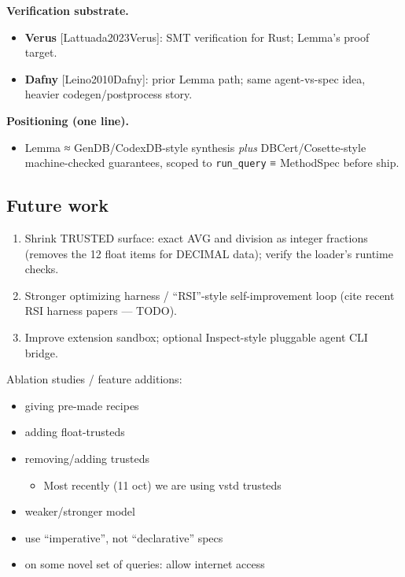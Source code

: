 \documentclass[
]{article}
\providecommand{\tightlist}{%
  \setlength{\itemsep}{0pt}\setlength{\parskip}{0pt}}
\begin{document}
\textbf{Verification substrate.}

\begin{itemize}
\tightlist
\item
  \textbf{Verus} {[}Lattuada2023Verus{]}: SMT verification for Rust;
  Lemma's proof target.
\item
  \textbf{Dafny} {[}Leino2010Dafny{]}: prior Lemma path; same
  agent-vs-spec idea, heavier codegen/postprocess story.
\end{itemize}

\textbf{Positioning (one line).}

\begin{itemize}
\tightlist
\item
  Lemma ≈ GenDB/CodexDB-style synthesis \emph{plus} DBCert/Cosette-style
  machine-checked guarantees, scoped to \texttt{run\_query} ≡ MethodSpec
  before ship.
\end{itemize}

\subsection{Future work}\label{future-work}

\begin{enumerate}
\def\labelenumi{\arabic{enumi}.}
\tightlist
\item
  Shrink TRUSTED surface: exact AVG and division as integer fractions
  (removes the 12 float items for DECIMAL data); verify the loader's
  runtime checks.
\item
  Stronger optimizing harness / ``RSI''-style self-improvement loop
  (cite recent RSI harness papers --- TODO).
\item
  Improve extension sandbox; optional Inspect-style pluggable agent CLI
  bridge.
\end{enumerate}

Ablation studies / feature additions:

\begin{itemize}
\tightlist
\item
  giving pre-made recipes
\item
  adding float-trusteds
\item
  removing/adding trusteds

  \begin{itemize}
  \tightlist
  \item
    Most recently (11 oct) we are using vstd trusteds
  \end{itemize}
\item
  weaker/stronger model
\item
  use ``imperative'', not ``declarative'' specs
\item
  on some novel set of queries: allow internet access
\end{itemize}
\end{document}
